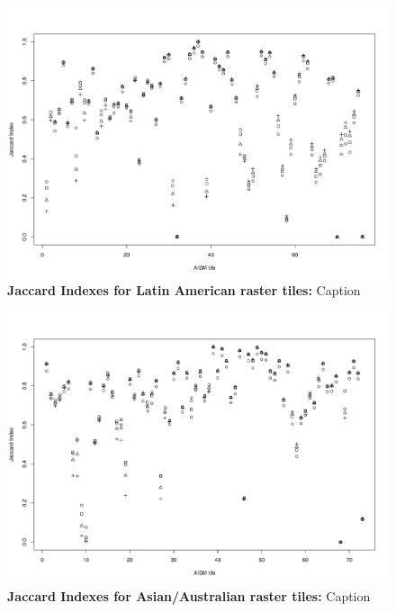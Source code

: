 	\begin{landscape}
		\begin{figure}[ht]
				\centering
				\includegraphics[scale=.65]{img/jaccard_tiles_americas}
				\caption[Jaccard Indexes for Latin American raster tiles]{\textbf{Jaccard Indexes for Latin American raster tiles:} Caption}
				\label{fig:jaccard_americas_appendix}
		\end{figure}
	\end{landscape}

	\begin{landscape}
		\begin{figure}[ht]
			\centering
			\includegraphics[scale=.65]{img/jaccard_tiles_asia}
			\caption[Jaccard Indexes for Asian/Australian raster tiles]{\textbf{Jaccard Indexes for Asian/Australian raster tiles:} Caption}
			\label{fig:jaccard_asia_appendix}
		\end{figure}
	\end{landscape}

